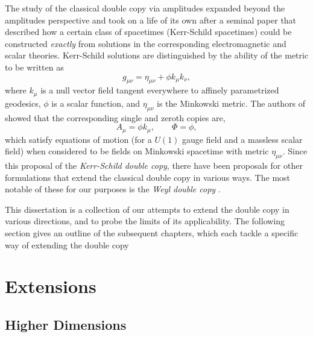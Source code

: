 The study of the classical double copy via amplitudes expanded beyond
the amplitudes perspective and took on a life of its own after a seminal paper \cite{Monteiro:2014cda}
that described how a certain class of spacetimes (Kerr-Schild spacetimes) could be constructed
\emph{exactly} from solutions in the corresponding electromagnetic and
scalar theories. Kerr-Schild solutions are distinguished by the ability of the
metric to be written as 
\begin{equation} \label{} 
g_{\mu \nu} = \eta_{\mu \nu} + \phi k_{\mu} k_{\nu},
\end{equation}
where $k_{\mu}$ is a null vector field tangent everywhere to affinely parametrized geodesics, $\phi$ is a scalar
function, and $\eta_{\mu \nu}$ is the Minkowski metric. The authors of \cite{Monteiro:2014cda} showed that the corresponding single and zeroth copies are,
\begin{equation} \label{Intro:Kerr-SchildSingleZerothCopies} 
    A_{\mu} = \phi k_{\mu}, \qquad \Phi = \phi,
\end{equation}
which satisfy equations of motion (for a $U(1)$ gauge field and a massless scalar field) when considered to be
fields on Minkowski spacetime with metric $\eta_{\mu \nu}$. Since this proposal of the \textit{Kerr-Schild double
copy}, there have been proposals for other formulations that extend the classical double copy in various ways. The
most notable of these for our purposes is the \textit{Weyl double copy} \cite{Luna:2018dpt, Godazgar:2020zbv}.

This dissertation is a collection of our attempts to extend the double copy in various directions, and to probe the
limits of its applicability. The following section gives an outline of the subsequent chapters, which each tackle a
specific way of extending the double copy

\section{Extensions}

\subsection{Higher Dimensions}

  
